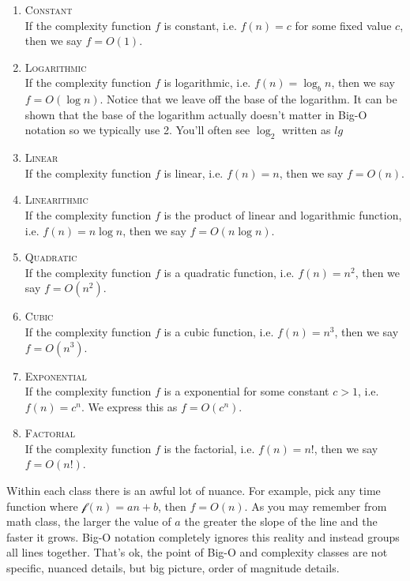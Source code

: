 \documentclass[]{tufte-handout}
\begin{document}
\begin{enumerate}
\item \textsc{Constant} \\
 If the complexity function $f$ is constant, i.e. $f(n) = c$ for some fixed value $c$,  then we say $f = O(1)$.

\item \textsc{Logarithmic} \\
 If the complexity function $f$ is  logarithmic, i.e. $f(n) = \log_b n$, then we say $f = O(\log n)$. Notice that we leave off the base of the logarithm. It can be shown that the base of the logarithm actually doesn't matter in Big-O notation so we typically use 2. You'll often see $\log_2$ written as $lg$ 

\item \textsc{Linear} \\
 If the complexity function $f$ is linear, i.e. $f(n) = n$, then we say $f = O(n)$. 

\item \textsc{Linearithmic} \\
 If the complexity function $f$ is the product of linear and logarithmic function, i.e. $f(n) = n\log n$, then we say $f = O(n\log n)$.

\item \textsc{Quadratic} \\
 If the complexity function $f$ is a quadratic function, i.e. $f(n) = n^2$, then we say $f = O(n^2)$.

\item \textsc{Cubic} \\ 
If the complexity function $f$ is a cubic function, i.e. $f(n) = n^3$, then we say $f = O(n^3)$.	

\item \textsc{Exponential} \\
If the complexity function $f$ is a exponential for some constant $c>1$, i.e. $f(n) = c^n$. We express this as  $f = O(c^n)$.

\item \textsc{Factorial} \\
If the complexity function $f$ is the factorial, i.e. $f(n) = n!$, then we say $f = O(n!)$.
\end{enumerate}

Within each class there is an awful lot of nuance. For example, pick any time function where $\mathcal{f}(n)= an + b$, then $f = O(n)$. As you may remember from math class, the larger the value of $a$ the greater the slope of the line and the faster it grows. Big-O notation completely ignores this reality and instead groups all lines together. That's ok, the point of Big-O and complexity classes are not specific, nuanced details, but big picture, order of magnitude details.
\end{document}
